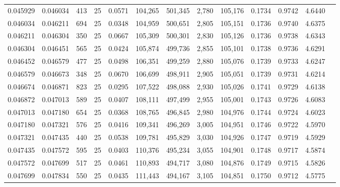 \begin{tabular}{rrrrrrrrrrrrr}
0.045929 & 0.046034 &   413 &  25 &                                     0.0571 & 104,265 & 501,345 &   2,780 & 105,176 & 0.1734 & 0.9742 & 4.6440 \\
0.046034 & 0.046211 &   694 &  25 &                                     0.0348 & 104,959 & 500,651 &   2,805 & 105,151 & 0.1736 & 0.9740 & 4.6375 \\
0.046211 & 0.046304 &   350 &  25 &                                     0.0667 & 105,309 & 500,301 &   2,830 & 105,126 & 0.1736 & 0.9738 & 4.6343 \\
0.046304 & 0.046451 &   565 &  25 &                                     0.0424 & 105,874 & 499,736 &   2,855 & 105,101 & 0.1738 & 0.9736 & 4.6291 \\
0.046452 & 0.046579 &   477 &  25 &                                     0.0498 & 106,351 & 499,259 &   2,880 & 105,076 & 0.1739 & 0.9733 & 4.6247 \\
0.046579 & 0.046673 &   348 &  25 &                                     0.0670 & 106,699 & 498,911 &   2,905 & 105,051 & 0.1739 & 0.9731 & 4.6214 \\
0.046674 & 0.046871 &   823 &  25 &                                     0.0295 & 107,522 & 498,088 &   2,930 & 105,026 & 0.1741 & 0.9729 & 4.6138 \\
0.046872 & 0.047013 &   589 &  25 &                                     0.0407 & 108,111 & 497,499 &   2,955 & 105,001 & 0.1743 & 0.9726 & 4.6083 \\
0.047013 & 0.047180 &   654 &  25 &                                     0.0368 & 108,765 & 496,845 &   2,980 & 104,976 & 0.1744 & 0.9724 & 4.6023 \\
0.047180 & 0.047321 &   576 &  25 &                                     0.0416 & 109,341 & 496,269 &   3,005 & 104,951 & 0.1746 & 0.9722 & 4.5970 \\
0.047321 & 0.047435 &   440 &  25 &                                     0.0538 & 109,781 & 495,829 &   3,030 & 104,926 & 0.1747 & 0.9719 & 4.5929 \\
0.047435 & 0.047572 &   595 &  25 &                                     0.0403 & 110,376 & 495,234 &   3,055 & 104,901 & 0.1748 & 0.9717 & 4.5874 \\
0.047572 & 0.047699 &   517 &  25 &                                     0.0461 & 110,893 & 494,717 &   3,080 & 104,876 & 0.1749 & 0.9715 & 4.5826 \\
0.047699 & 0.047834 &   550 &  25 &                                     0.0435 & 111,443 & 494,167 &   3,105 & 104,851 & 0.1750 & 0.9712 & 4.5775 \\

\end{tabular}
